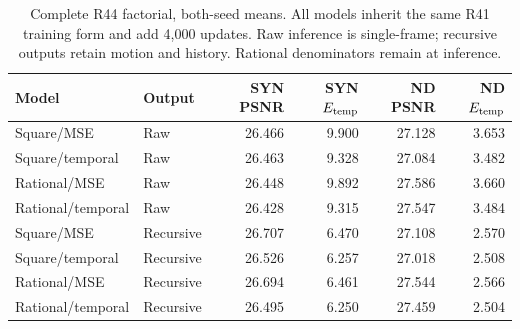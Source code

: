 \begin{table}[t]
\centering\small
\caption{Complete R44 factorial, both-seed means. All models inherit the same R41 training form and add 4,000 updates. Raw inference is single-frame; recursive outputs retain motion and history. Rational denominators remain at inference.}
\label{tab:r44}
\begin{tabular}{llrrrr}
\toprule
Model & Output & SYN PSNR & SYN $E_{\rm temp}$ & ND PSNR & ND $E_{\rm temp}$\\
\midrule
Square/MSE & Raw & 26.466 & 9.900 & 27.128 & 3.653\\
Square/temporal & Raw & 26.463 & 9.328 & 27.084 & 3.482\\
Rational/MSE & Raw & 26.448 & 9.892 & 27.586 & 3.660\\
Rational/temporal & Raw & 26.428 & 9.315 & 27.547 & 3.484\\
\midrule
Square/MSE & Recursive & 26.707 & 6.470 & 27.108 & 2.570\\
Square/temporal & Recursive & 26.526 & 6.257 & 27.018 & 2.508\\
Rational/MSE & Recursive & 26.694 & 6.461 & 27.544 & 2.566\\
Rational/temporal & Recursive & 26.495 & 6.250 & 27.459 & 2.504\\
\bottomrule
\end{tabular}
\end{table}
